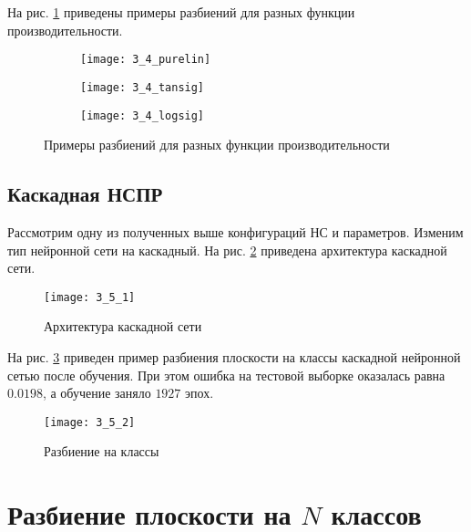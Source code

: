 На рис. \ref{fig:3_4} приведены примеры разбиений для разных функции производительности.
\vspace{-0.5cm}
\begin{figure}[H]
\begin{center}
	\begin{subfigure}[b]{0.49\textwidth}
		\texttt{[image: 3\_4\_purelin]}
		\caption{}
	\end{subfigure}
	\begin{subfigure}[b]{0.49\textwidth}
		\texttt{[image: 3\_4\_tansig]}
		\caption{}
	\end{subfigure}
	\begin{subfigure}[b]{0.49\textwidth}
		\texttt{[image: 3\_4\_logsig]}
		\caption{}
	\end{subfigure}
	\caption{Примеры разбиений для разных функции производительности}
	\label{fig:3_4}
\end{center}
\end{figure}

\subsection{Каскадная НСПР}

Рассмотрим одну из полученных выше конфигураций НС и параметров. Изменим тип нейронной сети на каскадный. На рис. \ref{fig:3_5_1} приведена архитектура каскадной сети.
\begin{figure}[H]
\begin{center}
	\texttt{[image: 3\_5\_1]}
	\caption{Архитектура каскадной сети}
	\label{fig:3_5_1}
\end{center}
\end{figure}

На рис. \ref{fig:3_5_2} приведен пример разбиения плоскости на классы каскадной нейронной сетью после обучения. При этом ошибка  на тестовой выборке оказалась равна $0.0198$, а обучение заняло $1927$ эпох.
\begin{figure}[H]
\begin{center}
	\texttt{[image: 3\_5\_2]}
	\caption{Разбиение на классы}
	\label{fig:3_5_2}
\end{center}
\end{figure}

\section{Разбиение плоскости на $N$ классов}

